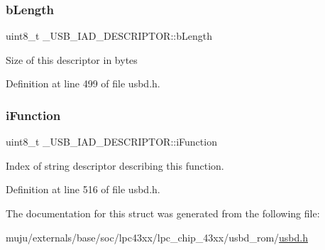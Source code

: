 \subsubsection{\texorpdfstring{b\+Length}{bLength}}
{\footnotesize\ttfamily uint8\+\_\+t \+\_\+\+U\+S\+B\+\_\+\+I\+A\+D\+\_\+\+D\+E\+S\+C\+R\+I\+P\+T\+O\+R\+::b\+Length}

Size of this descriptor in bytes 

Definition at line 499 of file usbd.\+h.

\mbox{\label{struct___u_s_b___i_a_d___d_e_s_c_r_i_p_t_o_r_a486ad14fb6b12d498212061b9610ce02}} 
\subsubsection{\texorpdfstring{i\+Function}{iFunction}}
{\footnotesize\ttfamily uint8\+\_\+t \+\_\+\+U\+S\+B\+\_\+\+I\+A\+D\+\_\+\+D\+E\+S\+C\+R\+I\+P\+T\+O\+R\+::i\+Function}

Index of string descriptor describing this function. 

Definition at line 516 of file usbd.\+h.



The documentation for this struct was generated from the following file\+:\begin{DoxyCompactItemize}
\item 
muju/externals/base/soc/lpc43xx/lpc\+\_\+chip\+\_\+43xx/usbd\+\_\+rom/\hyperlink{usbd_8h}{usbd.\+h}\end{DoxyCompactItemize}
